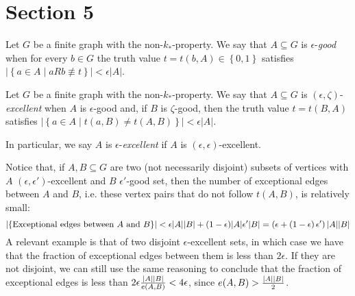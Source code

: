 \section{Section 5} \label{sec:section_5}

        Let $G$ be a finite graph with the non-$k_*$-property.
        We say that $A \subseteq G$ is $\epsilon$-\emph{good} when for every $b \in G$ the truth value
        $t = t(b, A) \in \left\{ 0, 1 \right\}$ satisfies $|\left\{ a\in A \mid aRb \not\equiv t \right\}| < \epsilon |A|$.

        Let $G$ be a finite graph with the non-$k_*$-property.
        We say that $A \subseteq G$ is $(\epsilon, \zeta)$-\emph{excellent} when $A$ is $\epsilon$-good and, if $B$ is
        $\zeta$-good, then the truth value $t = t(B,A)$ satisfies $|\left\{ a \in A \mid t(a,B) \neq t(A,B) \right\}| < \epsilon |A|$.

        In particular, we say $A$ is $\epsilon$-\emph{excellent} if $A$ is $(\epsilon, \epsilon)$-excellent.

    \begin{remark}\label{remark_excellence_imply_little_exceptions}
        Notice that, if $A, B \subseteq G$ are two (not necessarily disjoint) subsets of vertices
        with $A$ $(\epsilon, \epsilon')$-excellent and $B$ $\epsilon'$-good set, then the number of exceptional edges between $A$ and $B$,
        i.e. these vertex pairs that do not follow $t(A,B)$, is relatively small:
        $$
            \left| \left\{ \text{Exceptional edges between } A \text{ and } B \right\} \right| <
                \epsilon |A| |B| + (1- \epsilon) |A| \epsilon' |B| = \left( \epsilon + \left( 1-\epsilon \right) \epsilon' \right) |A| |B|
        $$
        A relevant example is that of two disjoint $\epsilon$-excellent sets, in which case we have that the fraction
        of exceptional edges between them is less than $2\epsilon$.
        If they are not disjoint, we can still use the same reasoning to conclude that the fraction of exceptional edges
        is less than $2 \epsilon \frac{\left| A \right| \left| B \right|}{e(A,B)} < 4 \epsilon$, since
        $e(A,B) > \frac{\left| A \right| \left| B \right|}{2}$.
    \end{remark}

